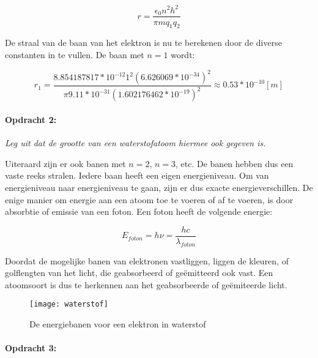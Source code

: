 \begin{equation} \label{eq:db7}
r=\frac{\epsilon_{0}n^{2}h^{2}}{\pi mq_{1}q_{2}}
\end{equation}


De straal van de baan van het elektron is nu te berekenen door de
diverse constanten in te vullen. De baan met $n=1$ wordt:

\begin{equation}
r_{1}=\frac{8.854187817*10^{-12}1^{2}\left(6.626069*10^{-34}\right)^{2}}
{\pi9.11*10^{-31}\left(1.602176462*10^{-19}\right)^{2}}\approx0.53*10^{-10}[m]
\end{equation}


\paragraph*{Opdracht 2:}

\emph{Leg uit dat de grootte van een waterstofatoom hiermee ook gegeven
is.}

Uiteraard zijn er ook banen met $n=2$, $n=3$, etc. De banen hebben
dus een vaste reeks stralen. Iedere baan heeft een eigen energieniveau.
Om van energieniveau naar energieniveau te gaan, zijn er dus exacte
energieverschillen. De enige manier om energie aan een atoom toe te
voeren of af te voeren, is door absorbtie of emissie van een foton.
Een foton heeft de volgende energie:

\begin{equation}
E_{foton}=h\nu=\frac{hc}{\lambda_{foton}}
\end{equation}


Doordat de mogelijke banen van elektronen vastliggen, liggen de kleuren,
of golflengten van het licht, die geabsorbeerd of geëmitteerd ook
vast. Een atoomsoort is dus te herkennen aan het geabsorbeerde of
geëmiteerde licht.

\begin{figure}[H]
\noindent \begin{centering}
\texttt{[image: waterstof]}
\par\end{centering}

\caption{De energiebanen voor een elektron in waterstof}
\end{figure}


\paragraph*{Opdracht 3:}

